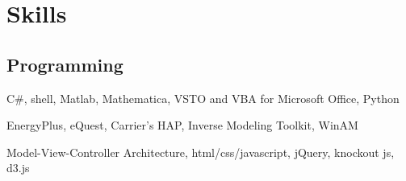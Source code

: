 \documentclass[]{deedy-resume-openfont}
\begin{document}
\begin{minipage}[t]{0.33\textwidth}




\section{Skills}
\subsection{Programming}

C\#, shell, Matlab, Mathematica, VSTO and \newline VBA for Microsoft Office, Python
\sectionsep

EnergyPlus, eQuest, Carrier's HAP, Inverse Modeling Toolkit, WinAM
\sectionsep

Model-View-Controller Architecture, html/css/javascript, jQuery,
knockout js, d3.js
\sectionsep


\end{minipage}
\end{document}
